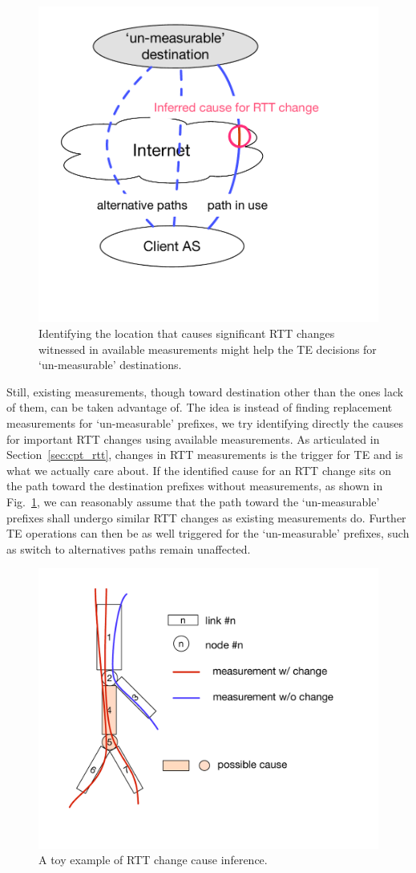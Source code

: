 \begin{figure}[!htb]
\centering
\includegraphics[width=.6\textwidth]{gfx/chap5/cause_infer_te.pdf}
\caption{Identifying the location that causes significant RTT changes witnessed in available measurements might help the TE decisions for `un-measurable' destinations.}
\label{fig:chap5_cause_infer_te}
\end{figure}

Still, existing measurements, though toward destination other than the ones lack of them, can be taken advantage of. The idea is instead of finding replacement measurements for `un-measurable' prefixes, we try identifying directly the causes for important RTT changes using available measurements. As articulated in Section~\ref{sec:cpt_rtt}, changes in RTT measurements is the trigger for TE and is what we actually care about. If the identified cause for an RTT change sits on the path toward the destination prefixes without measurements, as shown in Fig.~\ref{fig:chap5_cause_infer_te}, we can reasonably assume that the path toward the `un-measurable' prefixes shall undergo similar RTT changes as existing measurements do. Further TE operations can then be as well triggered for the `un-measurable' prefixes, such as switch to alternatives paths remain unaffected.

\begin{figure}[!htb]
\centering
\includegraphics[width=.75\textwidth]{gfx/chap5/toy_inference.pdf}
\caption{A toy example of RTT change cause inference.}
\label{fig:chap5_toy_inference}
\end{figure}

